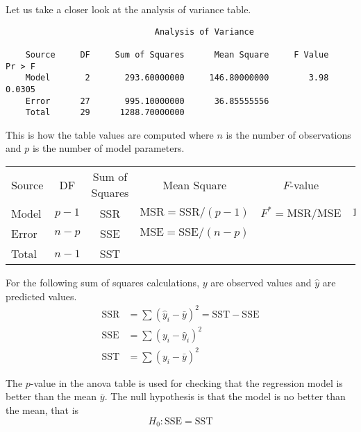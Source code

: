 \documentclass[12pt]{article}
\begin{document}
Let us take a closer look at the analysis of variance table.

{\footnotesize\begin{verbatim}
                              Analysis of Variance

    Source     DF     Sum of Squares      Mean Square     F Value     Pr > F
    Model       2       293.60000000     146.80000000        3.98     0.0305
    Error      27       995.10000000      36.85555556                       
    Total      29      1288.70000000
\end{verbatim}}

This is how the table values are computed where $n$ is the number of observations
and $p$ is the number of model parameters.

{\footnotesize\begin{center}\begin{tabular}{lccccc}
Source & DF & Sum of Squares & Mean Square & $F$-value & $p$-value
\\
Model
& $p-1$
& SSR
& $\text{MSR}=\text{SSR}/(p-1)$
& $F^*=\text{MSR}/\text{MSE}$
& $1-F(F^*,p-1,n-p)$\\
Error
& $n-p$
& SSE
& $\text{MSE}=\text{SSE}/(n-p)$
& &\\
Total
& $n-1$
& SST
& & &
\end{tabular}\end{center}}

For the following sum of squares calculations, $y$ are observed values and $\hat y$ are predicted values.
\begin{align*}
\text{SSR}&=\sum(\hat y_i-\bar y)^2=\text{SST}-\text{SSE}
\\
\text{SSE}&=\sum(y_i-\hat y_i)^2
\\
\text{SST}&=\sum(y_i-\bar y)^2
\end{align*}


The $p$-value in the anova table is used for checking that the regression model
is better than the mean $\bar y$.
The null hypothesis is that the model is no better than the mean, that is
\begin{equation*}
H_0:\text{SSE}=\text{SST}
\end{equation*}

\end{document}
